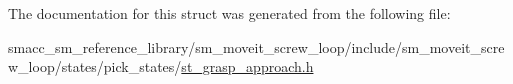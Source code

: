 The documentation for this struct was generated from the following file\+:\begin{DoxyCompactItemize}
\item 
smacc\+\_\+sm\+\_\+reference\+\_\+library/sm\+\_\+moveit\+\_\+screw\+\_\+loop/include/sm\+\_\+moveit\+\_\+screw\+\_\+loop/states/pick\+\_\+states/\hyperlink{sm__moveit__screw__loop_2include_2sm__moveit__screw__loop_2states_2pick__states_2st__grasp__approach_8h}{st\+\_\+grasp\+\_\+approach.\+h}\end{DoxyCompactItemize}
